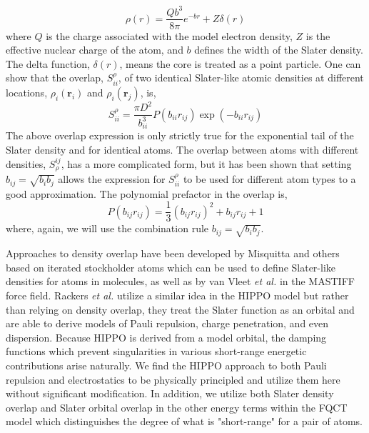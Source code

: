 \documentclass[journal=jctcce,manuscript=article]{achemso}
\begin{document}
\begin{equation}
  \rho(r)=\frac{Qb^3}{8\pi}e^{-br}+Z\delta(r)
  \label{eq:slater}
\end{equation}
\noindent
where $Q$ is the charge associated with the model electron density, $Z$ is the effective nuclear charge of the atom, and $b$ defines the width of the Slater density. The delta function, $\delta(r)$, means the core is treated as a point particle. One can show that the overlap, $S_{ii}^\rho$, of two identical Slater-like atomic densities at different locations, $\rho_i(\bm{r}_i)$ and $\rho_i(\bm{r}_j)$, is,
\begin{equation}
  S_{ii}^\rho=\frac{\pi D^2}{b_{ii}^3}P(b_{ii}r_{ij})\exp(-b_{ii}r_{ij})
\end{equation}
The above overlap expression is only strictly true for the exponential tail of the Slater density and for identical atoms. The overlap between atoms with different densities, $S^{ij}_\rho$, has a more complicated form, but it has been shown that setting $b_{ij}=\sqrt{b_ib_j}$ allows the expression
for $S_{ii}^\rho$ to be used for different atom types to a good
approximation\cite{van2016beyond}. The polynomial prefactor in the overlap is,
\begin{equation}
  P(b_{ij}r_{ij})=\frac13(b_{ij}r_{ij})^2 + b_{ij}r_{ij}+1
\end{equation}
where, again, we will use the combination rule $b_{ij}=\sqrt{b_ib_j}$. 

Approaches to density overlap have been developed by Misquitta and others\cite{misquitta2014distributed,misquitta2018isa} based on iterated stockholder atoms which can be used to define Slater-like densities for atoms in molecules, as well as by van Vleet \textit{et al.} in the MASTIFF force field.\cite{van2016beyond,van2018new} Rackers \textit{et al.} utilize a similar idea in the HIPPO model\cite{rackers2021polarizable}
but rather than relying on density overlap, they treat the Slater function as an orbital and are able to derive models of Pauli repulsion, charge penetration, and even dispersion. Because HIPPO is derived from a model orbital, the damping functions which prevent singularities in various short-range energetic contributions arise naturally. We find the HIPPO approach to both Pauli repulsion and electrostatics to be physically principled and utilize them here without significant modification. In addition, we utilize both Slater density overlap and Slater orbital overlap in the other energy terms within the FQCT model which distinguishes the degree of what is "short-range" for a pair of atoms. 
\end{document}
